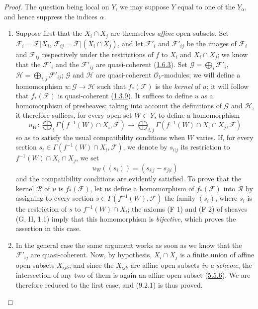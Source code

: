 \begin{proof}
The question being local on $Y$, we may suppose $Y$ equal to one of the
$Y_\alpha$, and hence suppress the indices $\alpha$.

\begin{enumerate}
\item[\emph{a)}] Suppose first that the $X_i\cap X_j$ are themselves
\emph{affine} open subsets. Set
$\mathscr{F}_i=\mathscr{F}|X_i$,
$\mathscr{F}_{ij}=\mathscr{F}|(X_i\cap X_j)$, and let
$\mathscr{F}'_i$ and $\mathscr{F}'_{ij}$ be the images of $\mathscr{F}_i$
and $\mathscr{F}_{ij}$ respectively under the restrictions of $f$ to $X_i$
and $X_i\cap X_j$; we know that the $\mathscr{F}'_i$ and the
$\mathscr{F}'_{ij}$ are quasi-coherent
(\hyperref[I.1.6.3]{1.6.3}). Set
$\mathscr{G}=\bigoplus_i\mathscr{F}'_i$,
$\mathscr{H}=\bigoplus_{i,j}\mathscr{F}'_{ij}$; $\mathscr{G}$ and
$\mathscr{H}$ are quasi-coherent $\mathscr{O}_Y$-modules; we will
define a homomorphism $u:\mathscr{G}\to\mathscr{H}$ such that
$f_*(\mathscr{F})$ is the \emph{kernel} of $u$; it will follow that
$f_*(\mathscr{F})$ is quasi-coherent
(\hyperref[I.1.3.9]{1.3.9}). It suffices to define $u$
as a homomorphism of presheaves; taking into account the definitions of
$\mathscr{G}$ and $\mathscr{H}$, it therefore suffices, for every open set
$W\subset Y$, to define a homomorphism
\[
  u_W:\bigoplus_i\Gamma(f^{-1}(W)\cap X_i,\mathscr{F})
  \longrightarrow
  \bigoplus_{i,j}\Gamma(f^{-1}(W)\cap X_i\cap X_j,\mathscr{F})
\]
so as to satisfy the usual compatibility conditions when $W$
varies. If, for every section
$s_i\in\Gamma(f^{-1}(W)\cap X_i,\mathscr{F})$, we denote by $s_{i|j}$ its
restriction to $f^{-1}(W)\cap X_i\cap X_j$, we set
\[
  u_W((s_i))=(s_{i|j}-s_{j|i})
\]
and the compatibility conditions are evidently satisfied. To
prove that the kernel $\mathscr{R}$ of $u$ is $f_*(\mathscr{F})$, let us
define a homomorphism of $f_*(\mathscr{F})$ into $\mathscr{R}$ by assigning
to every section $s\in\Gamma(f^{-1}(W),\mathscr{F})$ the family
$(s_i)$, where $s_i$ is the restriction of $s$ to $f^{-1}(W)\cap X_i$; the
axioms (F 1) and (F 2) of sheaves (G, II, 1.1) imply that this
homomorphism is \emph{bijective}, which proves the assertion in this case.

\item[\emph{b)}] In the general case the same argument works as soon as we know that the $\mathscr{F}'_{ij}$ are quasi-coherent. Now, by
hypothesis, $X_i\cap X_j$ is a finite union of affine open subsets
$X_{ijk}$; and since the $X_{ijk}$ are affine open subsets \emph{in a
scheme}, the intersection of any two of them is again an affine open subset
(\hyperref[I.5.5.6]{5.5.6}). We are therefore reduced to the first case,
and (9.2.1) is thus proved.
\end{enumerate}
\end{proof}

